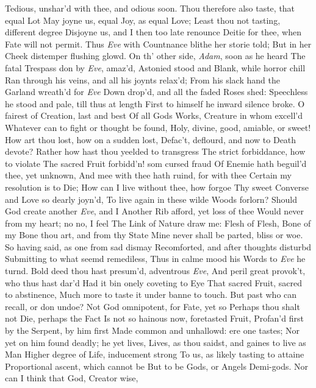 \documentclass[11pt]{book}
\newcounter {first}
\newcounter {last}
\begin{document}
Tedious, unshar'd with thee, and odious soon. 
Thou therefore also taste, that equal Lot 
May joyne us, equal Joy, as equal Love; 
Least thou not tasting, different degree 
Disjoyne us, and I then too late renounce 
Deitie for thee, when Fate will not permit. 
\quad Thus \textit{Eve} with Countnance blithe her storie told; 
But in her Cheek distemper flushing glowd. 
On th' other side, \textit{Adam}, soon as he heard 
The fatal Trespass don by \textit{Eve}, amaz'd, 
Astonied stood and Blank, while horror chill 
Ran through his veins, and all his joynts relax'd; 
From his slack hand the Garland wreath'd for \textit{Eve} 
Down drop'd, and all the faded Roses shed: 
Speechless he stood and pale, till thus at length 
First to himself he inward silence broke. 
\quad O fairest of Creation, last and best 
Of all Gods Works, Creature in whom excell'd 
Whatever can to fight or thought be found, 
Holy, divine, good, amiable, or sweet! 
How art thou lost, how on a sudden lost, 
Defac't, deflourd, and now to Death devote? 
Rather how hast thou yeelded to transgress 
The strict forbiddance, how to violate 
The sacred Fruit forbidd'n! som cursed fraud 
Of Enemie hath beguil'd thee, yet unknown, 
And mee with thee hath ruind, for with thee 
Certain my resolution is to Die; 
How can I live without thee, how forgoe 
Thy sweet Converse and Love so dearly joyn'd, 
To live again in these wilde Woods forlorn? 
Should God create another \textit{Eve}, and I 
Another Rib afford, yet loss of thee 
Would never from my heart; no no, I feel 
The Link of Nature draw me: Flesh of Flesh, 
Bone of my Bone thou art, and from thy State 
Mine never shall be parted, bliss or woe. 
\quad So having said, as one from sad dismay 
Recomforted, and after thoughts disturbd 
Submitting to what seemd remediless, 
Thus in calme mood his Words to \textit{Eve} he turnd. 
\quad Bold deed thou hast presum'd, adventrous \textit{Eve}, 
And peril great provok't, who thus hast dar'd 
Had it bin onely coveting to Eye 
That sacred Fruit, sacred to abstinence, 
Much more to taste it under banne to touch. 
But past who can recall, or don undoe? 
Not God omnipotent, for Fate, yet so 
Perhaps thou shalt not Die, perhaps the Fact 
Is not so hainous now, foretasted Fruit, 
Profan'd first by the Serpent, by him first 
Made common and unhallowd: ere one tastes; 
Nor yet on him found deadly; he yet lives, 
Lives, as thou saidst, and gaines to live as Man 
Higher degree of Life, inducement strong 
To us, as likely tasting to attaine 
Proportional ascent, which cannot be 
But to be Gods, or Angels Demi-gods. 
Nor can I think that God, Creator wise, 
\end{document}
